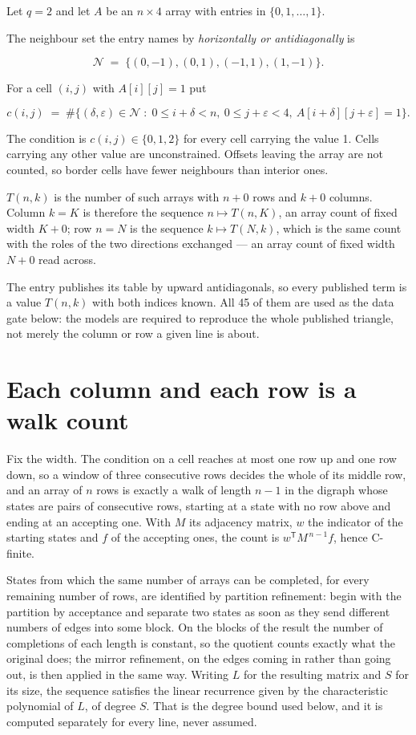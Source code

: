 \documentclass[11pt]{article}
\theoremstyle{definition}
\begin{document}
Let $q = 2$ and let $A$ be an $n \times 4$ array with entries in $\{0,1,\dots,1\}$.

The neighbour set the entry names by {\itshape horizontally or antidiagonally} is

\[\mathcal{N} \;=\; \{(0,-1), (0,1), (-1,1), (1,-1)\}.\]

For a cell $(i,j)$ with $A[i][j] = 1$ put

\[c(i,j) \;=\; \#\bigl\{(\delta,\varepsilon)\in\mathcal{N} \;:\; 0\le i+\delta<n,\ 0\le j+\varepsilon<4,\ A[i+\delta][j+\varepsilon] = 1\bigr\}.\]

The condition is $c(i,j) \in \{0, 1, 2\}$ for every cell carrying the value 1. Cells carrying any other value are unconstrained. Offsets leaving the array are not counted, so border cells have fewer neighbours than interior ones.

$T(n,k)$ is the number of such arrays with $n + 0$ rows and $k + 0$ columns. Column $k = K$ is therefore the sequence $n \mapsto T(n,K)$, an array count of fixed width $K + 0$; row $n = N$ is the sequence $k \mapsto T(N,k)$, which is the same count with the roles of the two directions exchanged --- an array count of fixed width $N + 0$ read across.

The entry publishes its table by upward antidiagonals, so every published term is a value $T(n,k)$ with both indices known. All 45 of them are used as the data gate below: the models are required to reproduce the whole published triangle, not merely the column or row a given line is about.

\section{Each column and each row is a walk count}

Fix the width. The condition on a cell reaches at most one row up and one row down, so a window of three consecutive rows decides the whole of its middle row, and an array of $n$ rows is exactly a walk of length $n-1$ in the digraph whose states are pairs of consecutive rows, starting at a state with no row above and ending at an accepting one. With $M$ its adjacency matrix, $w$ the indicator of the starting states and $f$ of the accepting ones, the count is $w^{\mathsf T}M^{\,n-1}f$, hence C-finite.

States from which the same number of arrays can be completed, for every remaining number of rows, are identified by partition refinement: begin with the partition by acceptance and separate two states as soon as they send different numbers of edges into some block. On the blocks of the result the number of completions of each length is constant, so the quotient counts exactly what the original does; the mirror refinement, on the edges coming in rather than going out, is then applied in the same way. Writing $L$ for the resulting matrix and $S$ for its size, the sequence satisfies the linear recurrence given by the characteristic polynomial of $L$, of degree $S$. That is the degree bound used below, and it is computed separately for every line, never assumed.
\end{document}
